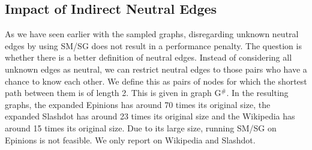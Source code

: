 \documentclass[acmtweb]{acmsmall}
\begin{document}
\begin{figure}[thbp!]
\end{figure}


\subsection{Impact of Indirect Neutral Edges} \label{sec:indirect-neutral}
As we have seen earlier with the sampled graphs, disregarding unknown
neutral edges by using SM/SG does not result in a performance
penalty. The question is whether there is a better definition of
neutral edges. Instead of considering all unknown edges as neutral, we
can restrict neutral edges to those pairs who have a chance to know
each other. We define this as pairs of nodes for which the shortest
path between them is of length 2.  This is given in graph G$^\#$.  In
the resulting graphs, the expanded Epinions has around 70 times its
original size, the expanded Slashdot has around 23 times its original
size and the Wikipedia has around 15 times its original size. Due to
its large size, running SM/SG on Epinions is not feasible. We only
report on Wikipedia and Slashdot.
\end{document}
